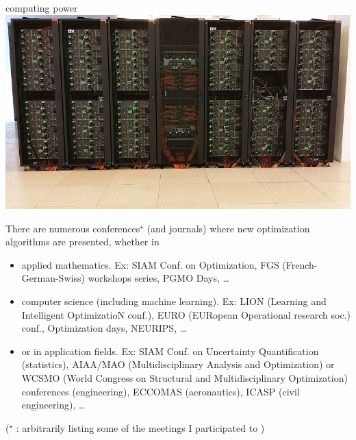 \documentclass[12pt]{beamer}
\begin{document}
\begin{frame}[allowframebreaks]
\begin{minipage}[t]{0.2\textwidth}
\centering
computing power 
\\\vskip 0.2cm
\includegraphics[width=\textwidth]{Figures/supercomputer.jpg} 
\end{minipage} 
\newpage
There are numerous conferences$^\star$ (and journals) where new optimization algorithms are presented, whether in 
\begin{itemize}
\item applied mathematics. Ex: {\scriptsize SIAM Conf. on Optimization, FGS (French-German-Swiss) workshops series, PGMO Days, \ldots}
\item computer science (including machine learning). Ex: {\scriptsize LION (Learning and Intelligent OptimizatioN conf.), EURO (EURopean Operational research soc.) conf., Optimization days, NEURIPS, \ldots}
\item or in application fields. Ex: {\scriptsize SIAM Conf. on Uncertainty Quantification (statistics), AIAA/MAO (Multidisciplinary Analysis and Optimization) or WCSMO (World Congress on Structural and Multidisciplinary Optimization) conferences (engineering), ECCOMAS (aeronautics), ICASP (civil engineering), \ldots}
\end{itemize}
\hfill($^\star$ {\scriptsize : arbitrarily listing some of the meetings I participated to} )
\end{frame}


\end{document}
